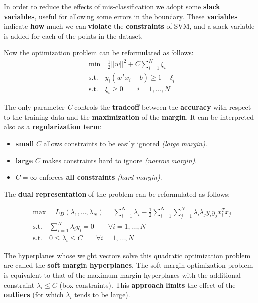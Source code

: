 In order to reduce the effects of mis-classification we adopt some \textbf{slack variables}, useful for allowing some errors in the boundary.
These \textbf{variables} indicate \textbf{how} much we can \textbf{violate} the \textbf{constraints} of SVM, and a slack variable is added for each of the points in the dataset. 

Now the optimization problem can be reformulated as follows:
\begin{equation*}
\begin{aligned}
&\text{min} \quad \frac{1}{2}||w||^2+ C\sum\limits_{i = 1}^N\xi_i\\
&\text{s.t.} \quad y_i(w^Tx_i-b)\geq 1 - \xi_i\\
&\text{s.t.} \quad \xi_i \geq 0 \qquad i = 1,\dots,N
\end{aligned}
\end{equation*}

The only parameter \textit{C} controls the \textbf{tradeoff} between the \textbf{accuracy} with respect to the training data and the \textbf{maximization} of the \textbf{margin}. It can be interpreted also as a \textbf{regularization term}:
\begin{itemize}
	\item \textbf{small} $C$ allows constraints to be easily ignored \textit{(large margin)}.
	\item \textbf{large} $C$ makes constraints hard to ignore \textit{(narrow margin)}.
	\item $C = \infty$ enforces \textbf{all constraints} \textit{(hard margin)}.
\end{itemize}

The \textbf{dual representation} of the problem can be reformulated as follows:

\begin{equation*}
\begin{aligned}
&\text{max }\quad L_D(\lambda_1,\dots,\lambda_N) = \sum_{i = 1}^{N}\lambda_i - \frac{1}{2}\sum_{i = 1}^{N}\sum_{j = 1}^{N}\lambda_i\lambda_jy_iy_jx_i^Tx_j\\
&\text{s.t.} \quad \sum_{i = 1}^{N}\lambda_iy_i= 0 \qquad \forall i = 1,\dots,N\\
&\text{s.t.} \quad 0 \leq \lambda_i \leq C \qquad \forall i = 1,\dots, N
\end{aligned}
\end{equation*}

The hyperplanes whose weight vectors solve this quadratic optimization problem are called the \textbf{soft margin hyperplanes}. The soft-margin optimization problem is equivalent to that of the maximum margin hyperplanes with the additional constraint $\lambda_i \leq C$ (box constraints). This \textbf{approach} \textbf{limits} the effect of the \textbf{outliers} (for which $\lambda_i$ tends to be large).

